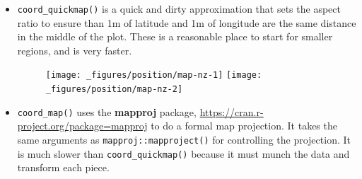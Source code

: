 \begin{itemize}
\item
  \texttt{coord\_quickmap()} is a quick and dirty approximation that
  sets the aspect ratio to ensure than 1m of latitude and 1m of
  longitude are the same distance in the middle of the plot. These is a
  reasonable place to start for smaller regions, and is very faster.

\begin{Shaded}
\begin{Highlighting}[]
\StringTok{ }\NormalTok{(}\NormalTok{(}\NormalTok{), }\OperatorTok{+}
\StringTok{  }\NormalTok{(} \NormalTok{, } \NormalTok{) }\OperatorTok{+}
\StringTok{  }\NormalTok{(}\NormalTok{) }\OperatorTok{+}\StringTok{ }\NormalTok{(}\NormalTok{)}

\OperatorTok{+}\StringTok{ }\NormalTok{()}
\end{Highlighting}
\end{Shaded}

  \begin{figure}[H]
    \centering
    \texttt{[image: \_figures/position/map-nz-1]}%
    \texttt{[image: \_figures/position/map-nz-2]}
  \end{figure}
\item
  \texttt{coord\_map()} uses the \textbf{mapproj} package,
  \url{https://cran.r-project.org/package=mapproj} to do a formal map
  projection. It takes the same arguments as
  \texttt{mapproj::mapproject()} for controlling the projection. It is
  much slower than \texttt{coord\_quickmap()} because it must munch the
  data and transform each piece.

\begin{Shaded}
\begin{Highlighting}[]
\StringTok{ }\NormalTok{(}\NormalTok{)}
\StringTok{ }\OperatorTok{+}
\StringTok{  }\NormalTok{() }\OperatorTok{+}
\StringTok{  }\NormalTok{(}\NormalTok{, }\NormalTok{ (}\OperatorTok{-}\OperatorTok{:}\NormalTok{) }\OperatorTok{*}\StringTok{ }\NormalTok{, } \NormalTok{) }\OperatorTok{+}
\StringTok{  }\NormalTok{(}\NormalTok{, }\NormalTok{ (}\OperatorTok{-}\OperatorTok{:}\NormalTok{) }\OperatorTok{*}\StringTok{ }\NormalTok{, } \NormalTok{)}


\end{Highlighting}
\end{Shaded}
\end{itemize}
